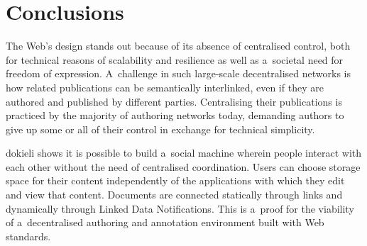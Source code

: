 \documentclass[a4paper]{llncs}
\begin{document}
                            
                        
                    

                    
                        \section{Conclusions}
  \label{conclusions}

                        
                            
\par 
                                The Web’s design stands out because of
                                its absence of centralised control,
                                both for technical reasons of scalability and resilience
                                as well as a societal need for freedom of expression.
                                A challenge in such large-scale decentralised networks
                                is how related publications can be semantically interlinked,
                                even if they are authored and published by different parties.
                                Centralising their publications is
                                practiced by the majority of authoring networks today,
                                demanding authors to give up some or all of their control
                                in exchange for technical simplicity.
                            
                            
\par 
                                dokieli shows
                                it is possible to build a social machine
                                wherein people interact with each other
                                without the need of centralised coordination.
                                Users can choose storage space for their content
                                independently of the applications with which they edit and view that content.
                                Documents are connected statically through links
                                and dynamically through Linked Data Notifications.
                                This is a proof for the viability of a decentralised authoring
                                and annotation environment built with Web standards.
                            
\end{document}
